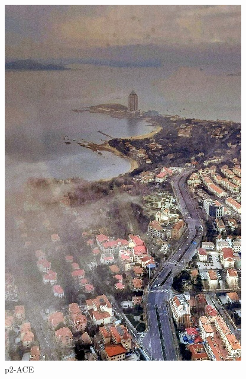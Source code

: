 \documentclass[12pt]{article}
\begin{document}
\begin{figure}[!h]
\begin{minipage}[t]{0.24\linewidth}
        \includegraphics[width=0.9\linewidth]{sample_pictures/after_p2_ACE.jpg}
        \caption*{p2-ACE}
    \end{minipage}\begin{minipage}[t]{0.24\linewidth}
        \centering

\end{minipage}
\end{figure}
\end{document}

